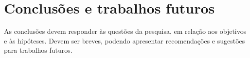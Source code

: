 \chapter{Conclusões e trabalhos futuros}
\label{cap:Conclusoes}

As conclusões devem responder às questões da pesquisa, em relação aos objetivos e às hipóteses. Devem ser breves, podendo apresentar recomendações e sugestões para trabalhos futuros.